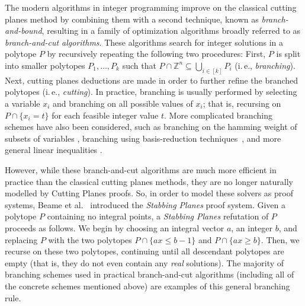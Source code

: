 \documentclass[11pt]{article}
\numberwithin{equation}{section}
\theoremstyle{definition}
\theoremstyle{plain}
\newcommand{\ie}{i.\,e.}
\newcommand{\set}[1]{\{ #1 \}}
\begin{document}
The modern algorithms in integer programming improve on the classical cutting planes method by combining them with a second technique, known as \emph{branch-and-bound}, resulting in a family of optimization algorithms broadly referred to as \emph{branch-and-cut algorithms}. 
These algorithms search for integer solutions in a polytope $P$ by recursively repeating the following two procedures: First, $P$ is split into smaller polytopes $P_1,\ldots, P_k$  such that $P \cap \mathbb{Z}^n \subseteq \bigcup_{i\in [k]} P_i$ (\ie, \emph{branching}). 
Next, cutting planes deductions are made in order to further refine the branched polytopes (\ie, \emph{cutting}). 
In practice, branching is usually performed by selecting a variable $x_i$ and branching on all possible values of $x_i$; that is, recursing on $P \cap \{x_i = t\}$ for each feasible integer value $t$.
More complicated branching schemes have also been considered, such as branching on the hamming weight of subsets of variables \cite{FischettiL03}, branching using basis-reduction techniques~\cite{AardalL04,KrishnamoorthyP09,AardalBHLS00}, and more general linear inequalities \cite{OwenM01,mahajanRT09,KaramanovC11}. 

However, while these branch-and-cut algorithms are much more efficient in practice than the classical cutting planes methods, they are no longer naturally modelled by Cutting Planes proofs.
So, in order to model these solvers as proof systems, Beame et al.~\cite{BeameFIKPPR18} introduced the \emph{Stabbing Planes} proof system.
%
%
Given a polytope $P$ containing no integral points, a \emph{Stabbing Planes} refutation of $P$ proceeds as follows.
We begin by choosing an integral vector $a$, an integer $b$, and replacing $P$ with the two polytopes $P \cap \set{ax \leq b-1}$ and $P \cap \set{ax \geq b}$.
Then, we recurse on these two polytopes, continuing until all descendant polytopes are empty (that is, they do not even contain any \emph{real} solutions).
The majority of branching schemes used in practical branch-and-cut algorithms (including all of the concrete schemes mentioned above) are examples of this general branching rule.
\end{document}
